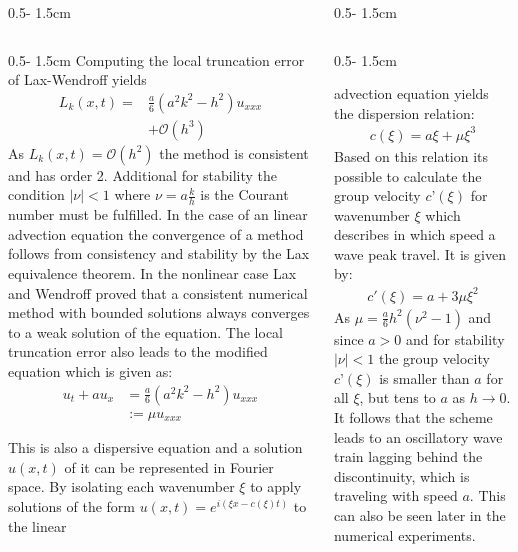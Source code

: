 \documentclass{uibposter}
\begin{document}
\begin{frame}[fragile]
\begin{columns}
\begin{column}{0.5\textwidth - 1.5cm}
\begin{column}{0.5\textwidth - 1.5cm}
\vspace{0.5cm}
Computing the local truncation error of Lax-Wendroff yields
\begin{align*}
L_k(x, t) = &\frac{a}{6}(a^2 k^2 - h^2)u_{xxx} \\
&+ \mathcal{O}(h^3)
\end{align*}
As $L_k(x,t) = \mathcal{O}(h^2)$ the method is consistent and has order 2. Additional for stability the condition $|\nu| < 1$ where $\nu = a\frac{k}{h}$ is the Courant number must be fulfilled. 
In the case of an linear advection equation the convergence of a method follows from consistency and stability by the Lax equivalence theorem. In the nonlinear case Lax and Wendroff proved that a consistent numerical method with bounded solutions always converges to a weak solution of the equation.
The local truncation error also leads to the modified equation which is given as:
\begin{align*}
u_t + a u_x &= \frac{a}{6} (a^2 k^2 - h^2) u_{xxx}\\
&:= \mu u_{xxx}
\end{align*}

This is also a dispersive equation and a solution $u(x, t)$ of it can be represented in Fourier space.  By isolating each wavenumber $\xi$ to apply solutions of the form $u(x,t) = e^{i(\xi x - c(\xi)t)}$ to the linear

    \end{column}
\end{column}
\begin{column}{0.5\textwidth - 1.5cm}
\begin{column}{0.5\textwidth - 1.5cm}
\vspace*{-1.7cm}

advection equation yields the dispersion relation:
\begin{align*}
c(\xi) = a\xi + \mu \xi^3
\end{align*}
Based on this relation its possible to calculate the group velocity $c’(\xi)$ for wavenumber $\xi$ which describes in which speed a wave peak travel. It is given by:
\begin{align*}
c'(\xi) = a + 3\mu \xi^2
\end{align*}
As $\mu = \frac{a}{6}h^2(\nu^2 - 1)$ and since $a > 0$ and for stability $|\nu| < 1$ the group velocity $c’(\xi)$ is smaller than $a$ for all $\xi$, but tens to $a$ as $h\rightarrow0$. It follows that the scheme leads to an oscillatory wave train lagging behind the discontinuity, which is traveling with speed $a$. This can also be seen later in the numerical experiments.
    

\end{column}
\end{column}
\end{columns}
\end{frame}
\end{document}
